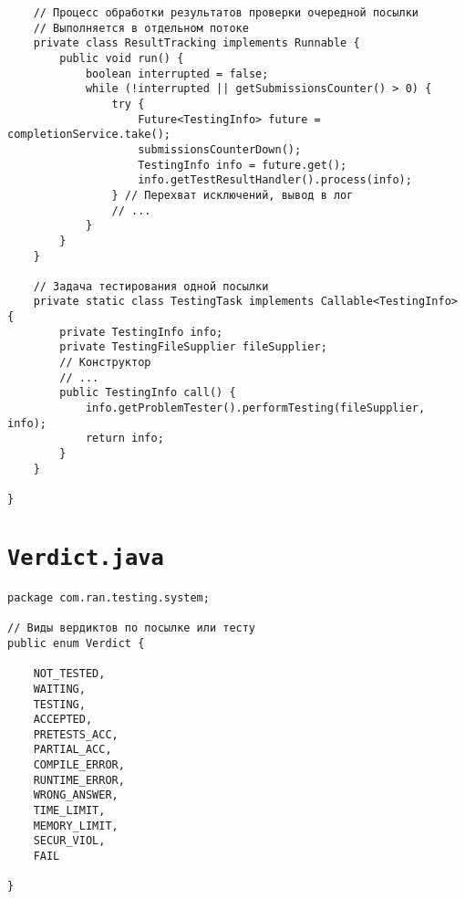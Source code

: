 \begin{verbatim}
    // Процесс обработки результатов проверки очередной посылки
    // Выполняется в отдельном потоке
    private class ResultTracking implements Runnable {
        public void run() {
            boolean interrupted = false;
            while (!interrupted || getSubmissionsCounter() > 0) {
                try {
                    Future<TestingInfo> future = completionService.take();
                    submissionsCounterDown();
                    TestingInfo info = future.get();
                    info.getTestResultHandler().process(info);
                } // Перехват исключений, вывод в лог
                // ...
            }
        }
    }
    
    // Задача тестирования одной посылки
    private static class TestingTask implements Callable<TestingInfo> {
        private TestingInfo info;
        private TestingFileSupplier fileSupplier;
        // Конструктор
        // ...
        public TestingInfo call() {
            info.getProblemTester().performTesting(fileSupplier, info);
            return info;
        }
    }
    
}
\end{verbatim}

\section*{\texttt{Verdict.java}}
\begin{verbatim}
package com.ran.testing.system;

// Виды вердиктов по посылке или тесту
public enum Verdict {

    NOT_TESTED,
    WAITING,
    TESTING,
    ACCEPTED,
    PRETESTS_ACC,
    PARTIAL_ACC,
    COMPILE_ERROR,
    RUNTIME_ERROR,
    WRONG_ANSWER,
    TIME_LIMIT,
    MEMORY_LIMIT,
    SECUR_VIOL,
    FAIL

}
\end{verbatim}

